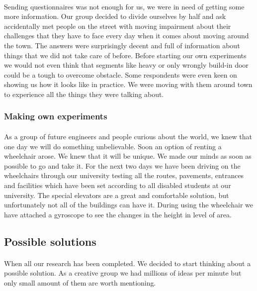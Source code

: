 \documentclass[12pt]{article}
\begin{document}
\paragraph{}Sending questionnaires was not enough for us, we were in need of getting some more information. Our group decided to divide ourselves by half and ask accidentally met people on the street with moving impairment about their challenges that they have to face every day when it comes about moving around the town. The answers were surprisingly decent and full of information about things that we did not take care of before. Before starting our own experiments we would not even think that segments like heavy or only wrongly build-in door could be a tough to overcome obstacle. Some respondents were even keen on showing us how it looks like in practice. We were moving with them around town to experience all the things they were talking about. 
\subsubsection{Making own experiments}
\paragraph{}As a group of future engineers and people curious about the world, we knew that one day we will do something unbelievable. Soon an option of renting a wheelchair arose. We knew that it will be unique. We made our minds as soon as possible to go and take it. For the next two days we have been driving on the wheelchairs through our university testing all the routes, pavements, entrances and facilities which have been set according to all disabled students at our university. The special elevators are a great and comfortable solution, but unfortunately not all of the buildings can have it. During using the wheelchair we have attached a gyroscope to see the changes in the height in level of area.   

\subsection{Possible solutions}
\paragraph{}When all our research has been completed. We decided to start thinking about a possible solution. As a creative group we had millions of ideas per minute but only small amount of them are worth mentioning. 
\end{document}
